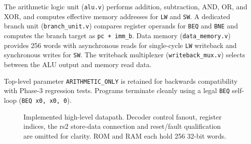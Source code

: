 \documentclass[conference,a4paper]{IEEEtran}
\begin{document}
The arithmetic logic unit (\texttt{alu.v}) performs addition, subtraction, AND, OR, and XOR, and computes effective memory addresses for \texttt{LW} and \texttt{SW}. A dedicated branch unit (\texttt{branch\_unit.v}) compares register operands for \texttt{BEQ} and \texttt{BNE} and computes the branch target as \texttt{pc + imm\_b}. Data memory (\texttt{data\_memory.v}) provides 256 words with asynchronous reads for single-cycle \texttt{LW} writeback and synchronous writes for \texttt{SW}. The writeback multiplexer (\texttt{writeback\_mux.v}) selects between the ALU output and memory read data.

Top-level parameter \texttt{ARITHMETIC\_ONLY} is retained for backwards compatibility with Phase-3 regression tests. Programs terminate cleanly using a legal \texttt{BEQ} self-loop (\texttt{BEQ x0, x0, 0}).

\begin{figure}[t]
\centering
{}
\caption{Implemented high-level datapath. Decoder control fanout, register
indices, the rs2 store-data connection and reset/fault qualification are omitted
for clarity. ROM and RAM each hold 256 32-bit words.}
\label{fig:architecture}
\end{figure}
\end{document}
